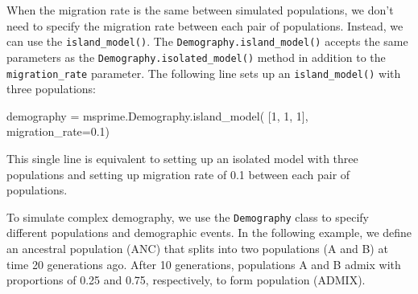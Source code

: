 \documentclass[graybox]{svmult}
\begin{document}
\label{island-model}
When the migration rate is the same between simulated populations, we don't
need to specify the migration rate between each pair of populations. Instead,
we can use the \texttt{island\_model()}. The \texttt{Demography.island\_model()} accepts
the same parameters as the \texttt{Demography.isolated\_model()} method in
addition to the \texttt{migration\_rate} parameter. The following line sets up an
\texttt{island\_model()} with three populations:
\begin{pythoncode}
    demography = msprime.Demography.island_model(
        [1, 1, 1], migration_rate=0.1)
\end{pythoncode}
This single line is equivalent to setting up an isolated model with three populations
and setting up migration rate of 0.1 between each pair of populations.




\label{Complex-demography}
To simulate complex demography, we use the \texttt{Demography} class to specify different
populations and demographic events. In the following example, we define
an ancestral population (ANC) that splits into two populations (A and B) at time
20 generations ago. After 10 generations, populations A and B admix with proportions of 0.25
and 0.75, respectively, to form population (ADMIX).
\end{document}
